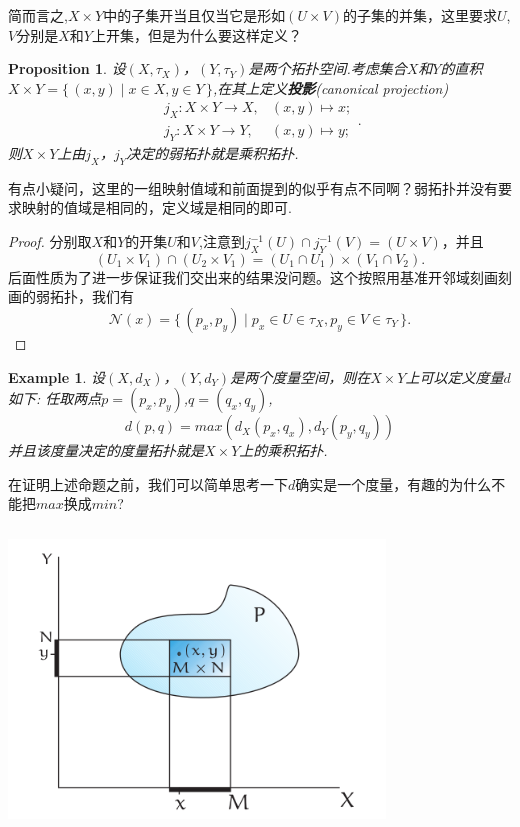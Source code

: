 \documentclass{article}
\newtheorem{proposition}[theorem]{Proposition}
\newtheorem{example}[theorem]{Example}
\newcommand*{\xfunc}[4]{{#2}\colon{#3}{#1}{#4}}
\newcommand*{\func}[3]{\xfunc{\to}{#1}{#2}{#3}}
\newcommand\Set[2]{\{\,#1\mid#2\,\}} %
\begin{document}
简而言之,$X \times Y$中的子集开当且仅当它是形如$(U \times V)$的子集的并集，这里要求$U$,$V$分别是$X$和$Y$上开集，但是为什么要这样定义？

\begin{proposition}
设$(X,\tau_X)$，$(Y,\tau_Y)$是两个拓扑空间.考虑集合$X$和$Y$的直积$X \times Y=\Set{(x,y)}{x \in X,y \in Y}$,在其上定义\textbf{投影}(canonical  projection)\[\begin{aligned}
			\func{j_X}{X \times Y}{X} ,& (x,y) \mapsto x;\\
			\func{j_Y}{X \times Y}{Y} ,& (x,y) \mapsto y; 
			\end{aligned}.	
			\]则$X \times Y$上由$j_X$，$j_Y$决定的弱拓扑就是乘积拓扑.		
\end{proposition}

有点小疑问，这里的一组映射值域和前面提到的似乎有点不同啊？弱拓扑并没有要求映射的值域是相同的，定义域是相同的即可.

\begin{proof}
分别取$X$和$Y$的开集$U$和$V$,注意到$j_X^{-1}(U) \cap j_Y^{-1}(V)=(U \times V)$，并且\[(U_1 \times V_1) \cap (U_2 \times V_1)=(U_1 \cap U_1)\times (V_1 \cap V_2).\]后面性质为了进一步保证我们交出来的结果没问题。这个按照用基准开邻域刻画刻画的弱拓扑，我们有\[\mathcal{N}(x)=\Set{(p_x,p_y)}{p_x \in U \in \tau_X,p_y \in V \in \tau_Y}.\]
\end{proof}

\begin{example}
设$(X,d_X)$，$(Y,d_Y)$是两个度量空间，则在$X \times Y$上可以定义度量$d$如下: 任取两点$p=(p_x,p_y)$,$q=(q_x,q_y)$,\[d(p,q)=max(d_X(p_x,q_x),d_Y(p_y,q_y))\]并且该度量决定的度量拓扑就是$X \times Y$上的乘积拓扑.
\end{example}

在证明上述命题之前，我们可以简单思考一下$d$确实是一个度量，有趣的为什么不能把$max$换成$min$?

\begin{center}
\includegraphics[width=10cm, height=8cm]{images/product_topology.png}
\end{center}
\end{document}

